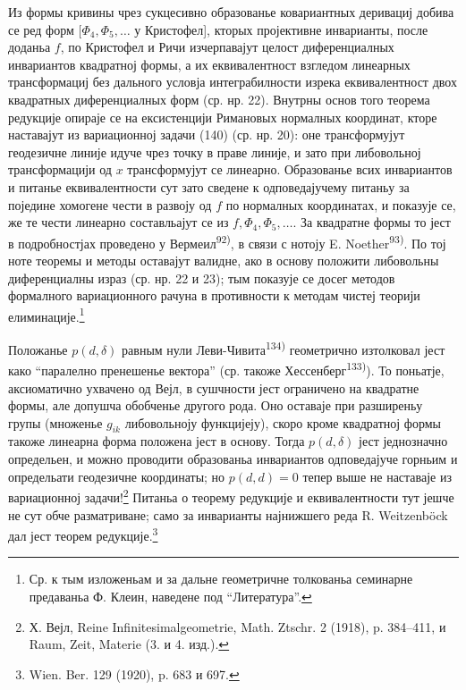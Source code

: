 ﻿\documentclass[11pt]{article}
\begin{document}
Из формы кривины чрез сукцесивно образованье ковариантных деривациј добива се ред форм $[\Phi_4,\Phi_5,\ldots$ у Кристофел], кторых пројективне инварианты, после доданьа $f$, по Кристофел и Ричи изчерпавајут целост диференциалных инвариантов квадратној формы, а их еквивалентност взгледом линеарных трансформациј без дального условја интеграбилности изрека еквивалентност двох квадратных диференциалных форм (ср. нр. 22). Внутрны основ того теорема редукције опираје се на ексистенцији Римановых нормалных координат, кторе наставајут из вариационној задачи (140) (ср. нр. 20): оне трансформујут геодезичне линије идуче чрез точку в праве линије, и зато при либовольној трансформацији од $x$ трансформујут се линеарно. Образованье всих инвариантов и питанье еквивалентности сут зато сведене к одповедајучему питаньу за поједине хомогене чести в развоју од $f$ по нормалных координатах, и показује се, же те чести линеарно составльајут се из $f,\Phi_4,\Phi_5,\ldots$. За квадратне формы то јест в подробностјах проведено у Вермеил\textsuperscript{92)}, в связи с нотоју E. Noether\textsuperscript{93)}. По тој ноте теоремы и методы оставајут валидне, ако в основу положити либовольны диференциалны израз (ср. нр. 22 и 23); тым показује се досег методов формалного вариационного рачуна в противности к методам чистеј теорији елиминације.\footnote{Ср. к тым изложеньам и за дальне геометричне толкованьа семинарне предаваньа Ф. Клеин, наведене под ``Литература''.}

Положанье $p(d,\delta)$ равным нули Леви-Чивита\textsuperscript{134)} геометрично изтолковал јест како ``паралелно пренешенье вектора'' (ср. такоже Хессенберг\textsuperscript{133)}). То поньатје, аксиоматично ухвачено од Вејл, в сушчности јест ограничено на квадратне формы, але допушча обобченье другого рода. Оно оставаје при разширеньу групы (множенье $g_{ik}$ либовольноју функцијеју), скоро кроме квадратној формы такоже линеарна форма положена јест в основу. Тогда $p(d,\delta)$ јест једнозначно определьен, и можно проводити образованьа инвариантов одповедајуче горньим и определьати геодезичне координаты; но $p(d,d)=0$ тепер выше не наставаје из вариационној задачи!\footnote{Х. Вејл, Reine Infinitesimalgeometrie, Math. Ztschr. 2 (1918), p. 384--411, и Raum, Zeit, Materie (3. и 4. изд.).} Питаньа о теорему редукције и еквивалентности тут јешче не сут обче разматриване; само за инварианты најнижшего реда R. Weitzenböck дал јест теорем редукције.\footnote{Wien. Ber. 129 (1920), p. 683 и 697.}
\end{document}
